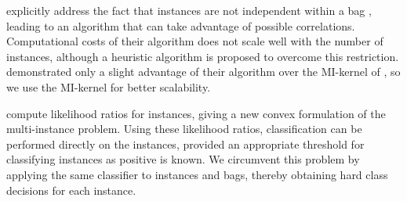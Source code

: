 \citet{zhou2009multi} explicitly address the fact that instances are not
independent within a bag , leading to an algorithm that can take advantage of
possible correlations. Computational costs of their algorithm does not scale
well with the number of instances, although a heuristic algorithm is proposed
to overcome this restriction. 
\citet{zhou2009multi} demonstrated only a slight
advantage of their algorithm over the MI-kernel of \citet{gaertner2002multi},
so we use the MI-kernel for better scalability.

\citet{liconvex2010} compute likelihood ratios for instances, giving a new
convex formulation of the multi-instance problem. Using these likelihood
ratios, classification can be performed directly on the instances, provided an
appropriate threshold for classifying instances as positive is known. We
circumvent this problem by applying the same classifier to instances and bags,
thereby obtaining hard class decisions for each instance.



